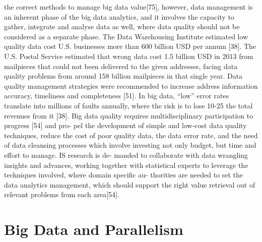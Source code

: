 the correct methods to manage big data value[75], however, data management is an
inherent phase of the big data analytics, and it involves the capacity to gather, integrate
and analyse data as well, where data quality should not be considered as a separate
phase.
The Data Warehousing Institute estimated low quality data cost U.S. businesses
more than 600 billion USD per annum [38]. The U.S. Postal Service estimated that
wrong data cost 1.5 billion USD in 2013 from mailpieces that could not been delivered
to the given addresses, facing data quality problems from around 158 billion mailpieces
in that single year. Data quality management strategies were recommended to increase
address information accuracy, timeliness and completeness [51]. In big data, “low”
error rates translate into millions of faults annually, where the risk is to lose 10-25%
the total revenues from it [38].
Big data quality requires multidisciplinary participation to progress [54] and pro-
pel the development of simple and low-cost data quality techniques, reduce the cost of
poor quality data, the data error rate, and the need of data cleansing processes which
involve investing not only budget, but time and effort to manage. IS research is de-
manded to collaborate with data wrangling insights and advances, working together
with statistical experts to leverage the techniques involved, where domain specific au-
thorities are needed to set the data analytics management, which should support the
right value retrieval out of relevant problems from each area[54].

\section{Big Data and Parallelism}

